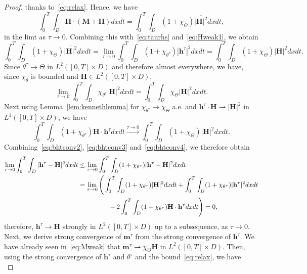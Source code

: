 \documentclass[10pt,letterpaper,twoside]{amsart}
\theoremstyle{definition}{\newtheorem{definition}[lemma]{Definition}}
\theoremstyle{note}{\newtheorem{claim}{Claim}[section]
\newtheorem*{claim*}{Claim}}
\numberwithin{equation}{section}
\newcommand{\dom}{D}
\newcommand{\weak}{\rightharpoonup}
\newcommand{\Bm}{\mathbf{M}}
\newcommand{\Bh}{\mathbf{H}}
\newcommand{\bmt}{\mathbf{m}^{\tau}}
\newcommand{\bht}{\mathbf{h}^{\tau}}
\newcommand{\tht}{\theta^{\tau}}
\begin{document}
\begin{proof}
	thanks to~\eqref{eq:relax}. Hence, we have
		\begin{equation}\label{eq:bhtconv1}
		\int_0^T\int_{\dom} \overline{\Bh\cdot(\Bm+\Bh)} dx dt =	\int_0^T\int_{\dom} (1+\chi_{\Theta})\overline{|\Bh|^2} dx dt,
	\end{equation}
	in the limt as $\tau\to 0$. Combining this with~\eqref{eq:taurhs} and~\eqref{eq:Hweak1}, we obtain
	\begin{equation}\label{eq:bhtconv2}
		\int_0^T\int_{\dom}(1+\chi_{\Theta})\overline{|\Bh|^2} dx dt=\lim_{\tau\to 0} \int_0^T\int_{\dom}(1+\chi_{\tht})|\bht|^2 dx dt =\int_0^T\int_{\dom}(1+\chi_{\Theta}){|\Bh|^2} dx dt.
	\end{equation}
	Since $\tht\to \Theta$ in $L^2([0,T]\times\dom)$ and therefore almost everywhere, we have, since $\chi_\theta$ is bounded and $\Bh\in L^2([0,T]\times\dom)$,
	\begin{equation}\label{eq:bhtconv3}
		\lim_{\tau\to 0}\int_0^T\int_{\dom}\chi_{\tht}|\Bh|^2 dx dt = \int_0^T\int_{\dom} \chi_{\Theta} |\Bh|^2 dx dt.
	\end{equation}
	Next using Lemma~\ref{lem:kennethlemma} for $\chi_{\tht}\to \chi_{\Theta}$ a.e. and $\bht\cdot \Bh\weak |\Bh|^2$ in $L^1([0,T]\times\dom)$, we have
	\begin{equation}\label{eq:bhtconv4}
		\int_0^T\int_{\dom} (1+\chi_{\tht})\Bh \cdot \bht dx dt \stackrel{\tau\to 0}{\longrightarrow}\int_0^T\int_{\dom} (1+\chi_{\Theta})|\Bh|^2 dx dt.
	\end{equation}
	Combining~\eqref{eq:bhtconv2}, \eqref{eq:bhtconv3} and~\eqref{eq:bhtconv4}, we therefore obtain
	\begin{align*}
	\lim_{\tau\to 0}	\int_0^T\int_{\dom} |\bht-\Bh|^2 dx dt & \leq \lim_{\tau\to 0}	\int_0^T\int_{\dom} (1+\chi_{\tht})|\bht-\Bh|^2 dx dt\\
	& = \lim_{\tau\to 0}\Bigg(\int_0^T\int_{\dom}(1+\chi_{\tht})|\Bh|^2 dx dt +\int_0^T\int_{\dom}(1+\chi_{\tht})|\bht|^2 dx dt\\
	&\hphantom{ = \lim_{\tau\to 0}\Bigg(}\quad -2\int_0^T\int_{\dom}(1+\chi_{\tht})\Bh\cdot\bht dx dt\Bigg) =0,
	\end{align*}
	therefore, $\bht\to \Bh$ strongly in $L^2([0,T]\times\dom)$ up to a subsequence, as $\tau\to 0$. Next, we derive strong convergence of $\bmt$ from the strong convergence of $\bht$. We have already seen in~\eqref{eq:Mweak} that $\bmt\weak \chi_{\Theta}\Bh$ in $L^2([0,T]\times\dom)$. Then, using the strong convergence of $\bht$ and $\tht$ and the bound~\eqref{eq:relax}, we have
	\begin{equation*}

\end{equation*}
\end{proof}
\end{document}

